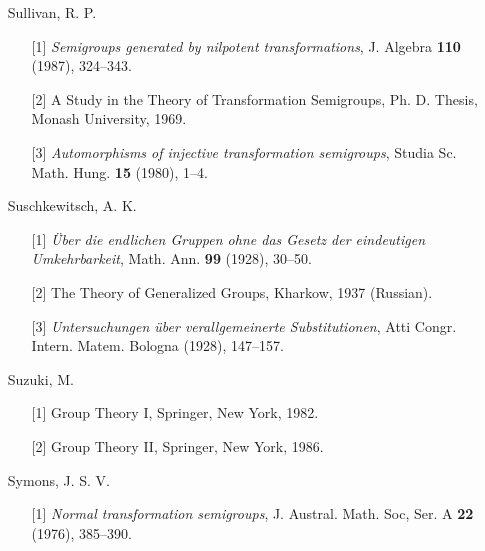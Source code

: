 \documentclass{surv-l}
\numberwithin{equation}{section}
\numberwithin{table}{section}
\numberwithin{figure}{section}
\theoremstyle{definition}
\begin{document}
\begin{enumerate}
\item[] Sullivan, R. P.
\begin{enumerate}
\item[\hypertarget{bib72}{[1]}] \emph{Semigroups generated by nilpotent
transformations}, J. Algebra \textbf{110} (1987),
324--343.

\item[\hypertarget{bib72a}{[2]}] A Study in the Theory of Transformation Semigroups, Ph.
D. Thesis, Monash University, 1969.

\item[\hypertarget{bib72b}{[3]}] \emph{Automorphisms of injective transformation
semigroups}, Studia Sc. Math. Hung. \textbf{15} (1980),
1--4.
\end{enumerate}

\item[] Suschkewitsch, A. K.
\begin{enumerate}
\item[\hypertarget{bib73}{[1]}] \emph{\"{U}ber die endlichen Gruppen ohne das
Gesetz der eindeutigen Umkehrbarkeit}, Math. Ann.
\textbf{99} (1928), 30--50.

\item[\hypertarget{bib73a}{[2]}] The Theory of Generalized Groups, Kharkow, 1937
(Russian).

\item[\hypertarget{bib73b}{[3]}] \emph{Untersuchungen \"{u}ber verallgemeinerte
Substitutionen}, Atti Congr. Intern. Matem. Bologna
(1928), 147--157.
\end{enumerate}

\item[] Suzuki, M.
\begin{enumerate}
\item[\hypertarget{bib74}{[1]}] Group Theory I, Springer, New York, 1982.

\item[\hypertarget{bib74a}{[2]}] Group Theory II, Springer, New York, 1986.
\end{enumerate}

\item[] Symons, J. S. V.
\begin{enumerate}
\item[\hypertarget{bib75}{[1]}] \emph{Normal transformation semigroups}, J. Austral.
Math. Soc, Ser. A \textbf{22} (1976), 385--390.
\end{enumerate}


\end{enumerate}
\end{document}
